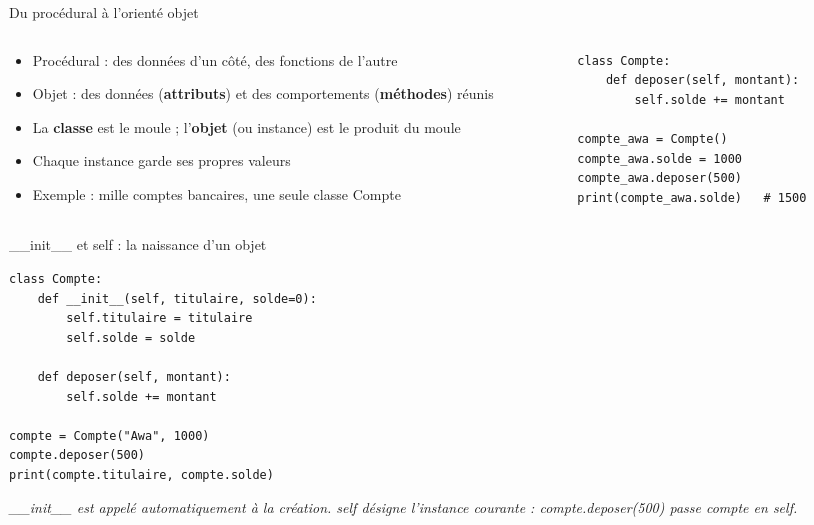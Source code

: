 \documentclass[aspectratio=169,11pt]{beamer}
\begin{document}
\begin{frame}[fragile]{Du procédural à l'orienté objet}
\begin{columns}[t]
\begin{column}{0.42\textwidth}
\begin{itemize}
  \setlength{\itemsep}{1.5pt}\setlength{\parskip}{0pt}
  \item Procédural : des données d'un côté, des fonctions de l'autre
  \item Objet : des données (\textbf{attributs}) et des comportements (\textbf{méthodes}) réunis
  \item La \textbf{classe} est le moule ; l'\textbf{objet} (ou instance) est le produit du moule
  \item Chaque instance garde ses propres valeurs
  \item Exemple : mille comptes bancaires, une seule classe Compte
\end{itemize}
\end{column}
\hspace{0.02\textwidth}
\begin{column}{0.55\textwidth}
\begin{lstlisting}[style=pysmall]
class Compte:
    def deposer(self, montant):
        self.solde += montant

compte_awa = Compte()
compte_awa.solde = 1000
compte_awa.deposer(500)
print(compte_awa.solde)   # 1500
\end{lstlisting}
\end{column}
\end{columns}
\end{frame}

\begin{frame}[fragile]{\_\_init\_\_ et self : la naissance d'un objet}

\begin{lstlisting}[style=py]
class Compte:
    def __init__(self, titulaire, solde=0):
        self.titulaire = titulaire
        self.solde = solde

    def deposer(self, montant):
        self.solde += montant

compte = Compte("Awa", 1000)
compte.deposer(500)
print(compte.titulaire, compte.solde)
\end{lstlisting}
\vspace{0.5pt}

{\small\color{PyGris}\itshape \_\_init\_\_ est appelé automatiquement à la création. self désigne l'instance courante : compte.deposer(500) passe compte en self.}

\end{frame}
\end{document}
